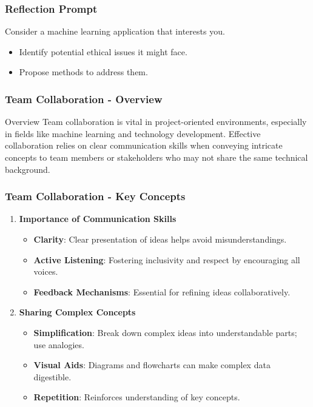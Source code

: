 \documentclass[aspectratio=169]{beamer}
\begin{document}
\begin{frame}[fragile]
    \frametitle{Reflection Prompt}
    Consider a machine learning application that interests you. 
    \begin{itemize}
        \item Identify potential ethical issues it might face. 
        \item Propose methods to address them.
    \end{itemize}
\end{frame}

\begin{frame}[fragile]
    \frametitle{Team Collaboration - Overview}
    \begin{block}{Overview}
        Team collaboration is vital in project-oriented environments, especially in fields like machine learning and technology development. Effective collaboration relies on clear communication skills when conveying intricate concepts to team members or stakeholders who may not share the same technical background.
    \end{block}
\end{frame}

\begin{frame}[fragile]
    \frametitle{Team Collaboration - Key Concepts}
    \begin{enumerate}
        \item \textbf{Importance of Communication Skills}
            \begin{itemize}
                \item \textbf{Clarity}: Clear presentation of ideas helps avoid misunderstandings.
                \item \textbf{Active Listening}: Fostering inclusivity and respect by encouraging all voices.
                \item \textbf{Feedback Mechanisms}: Essential for refining ideas collaboratively.
            \end{itemize}
        \item \textbf{Sharing Complex Concepts}
            \begin{itemize}
                \item \textbf{Simplification}: Break down complex ideas into understandable parts; use analogies.
                \item \textbf{Visual Aids}: Diagrams and flowcharts can make complex data digestible.
                \item \textbf{Repetition}: Reinforces understanding of key concepts.
            \end{itemize}
    \end{enumerate}
\end{frame}
\end{document}
